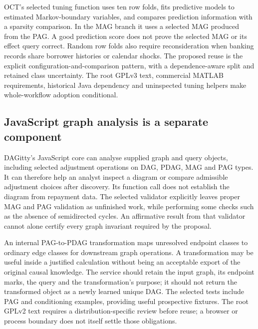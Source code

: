 OCT's selected tuning function uses ten row folds, fits predictive
models to estimated Markov-boundary variables, and compares prediction
information with a sparsity comparison. In the MAG branch it uses a
selected MAG produced from the PAG. A good prediction score does not
prove the selected MAG or its effect query correct. Random row folds
also require reconsideration when banking records share borrower
histories or calendar shocks. The proposed reuse is the explicit
configuration-and-comparison pattern, with a dependence-aware split and
retained class uncertainty. The root GPLv3 text, commercial MATLAB
requirements, historical Java dependency and uninspected tuning helpers
make whole-workflow adoption conditional. \citep{exec14_olatent_oct}

\hypertarget{javascript-graph-analysis-is-a-separate-component}{%
\subsection{JavaScript graph analysis is a separate
component}\label{javascript-graph-analysis-is-a-separate-component}}

DAGitty's JavaScript core can analyse supplied graph and query objects,
including selected adjustment operations on DAG, PDAG, MAG and PAG
types. It can therefore help an analyst inspect a diagram or compare
admissible adjustment choices after discovery. Its function call does
not establish the diagram from repayment data. The selected validator
explicitly leaves proper MAG and PAG validation as unfinished work,
while performing some checks such as the absence of semidirected cycles.
An affirmative result from that validator cannot alone certify every
graph invariant required by the proposal. \citep{exec14_olatent_dagitty}

An internal PAG-to-PDAG transformation maps unresolved endpoint classes
to ordinary edge classes for downstream graph operations. A
transformation may be useful inside a justified calculation without
being an acceptable export of the original causal knowledge. The service
should retain the input graph, its endpoint marks, the query and the
transformation's purpose; it should not return the transformed object as
a newly learned unique DAG. The selected tests include PAG and
conditioning examples, providing useful prospective fixtures. The root
GPLv2 text requires a distribution-specific review before reuse; a
browser or process boundary does not itself settle those obligations.
\citep{exec14_olatent_dagitty}

